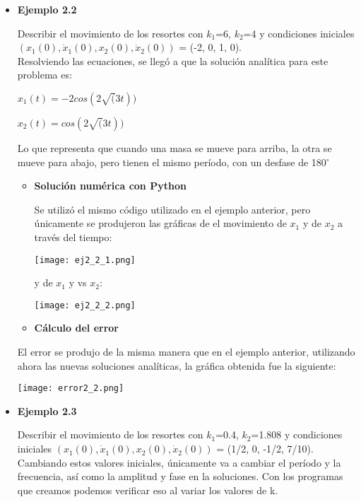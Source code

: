 \documentclass[12pt]{article}
\begin{document}
\begin{itemize}
\item \textbf{Ejemplo 2.2}

Describir el movimiento de los resortes con $k_1$=6, $k_2$=4 y condiciones iniciales $(x_1(0), \dot x_1(0), x_2(0), \dot x_2(0))$ = (-2, 0, 1, 0).\\

Resolviendo las ecuaciones, se llegó a que la solución analítica para este problema es: \\

\centerline{$x_1(t) = -2cos (2\sqrt (3t))$}
\centerline{$x_2(t) = cos (2\sqrt (3t))$}

Lo que representa que cuando una masa se mueve para arriba, la otra se mueve para abajo, pero tienen el mismo período, con un desfase de 180$^\circ$

\begin{itemize}
\item \textbf{Solución numérica con Python}

Se utilizó el mismo código utilizado en el ejemplo anterior, pero únicamente se produjeron las gráficas de el movimiento de $x_1$ y de $x_2$ a través del tiempo:


\begin{center}
        \texttt{[image: ej2\_2\_1.png]}
\end{center}

y de $x_1$ y vs $x_2$:


\begin{center}
        \texttt{[image: ej2\_2\_2.png]}
\end{center}

\item \textbf{Cálculo del error}
\end{itemize}

El error se produjo de la misma manera que en el ejemplo anterior, utilizando ahora las nuevas soluciones analíticas, la gráfica obtenida fue la siguiente:


\begin{center}
        \texttt{[image: error2\_2.png]}
\end{center}

\item \textbf{Ejemplo 2.3}

Describir el movimiento de los resortes con $k_1$=0.4, $k_2$=1.808 y condiciones iniciales $(x_1(0), \dot x_1(0), x_2(0), \dot x_2(0))$ = (1/2, 0, -1/2, 7/10).\\

Cambiando estos valores iniciales, únicamente va a cambiar el período y la frecuencia, así como la amplitud y fase en la soluciones. Con los programas que creamos podemos verificar eso al variar los valores de k. 


\end{itemize}
\end{document}
